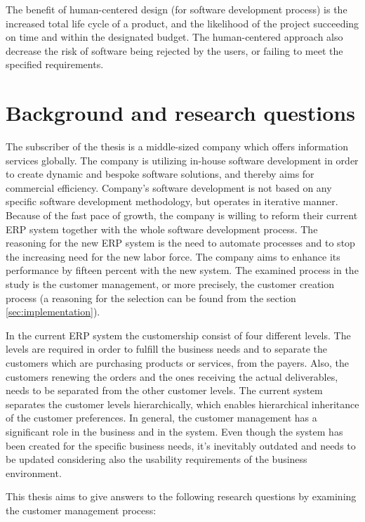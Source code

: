 \documentclass[12pt,a4paper,oneside,pdftex]{report}
\begin{document}
The benefit of human-centered design (for software development process) is the increased total life cycle of a product, and the likelihood of the project succeeding on time and within the designated budget. The human-centered approach also decrease the risk of software being rejected by the users, or failing to meet the specified requirements. \cite{RefWorks:16}

\section{Background and research questions}
\label{sec:background}
The subscriber of the thesis is a middle-sized company which offers information services globally. The company is utilizing in-house software development in order to create dynamic and bespoke software solutions, and thereby aims for commercial efficiency. Company's software development is not based on any specific software development methodology, but operates in iterative manner. Because of the fast pace of growth, the company is willing to reform their current ERP system together with the whole software development process. The reasoning for the new ERP system is the need to automate processes and to stop the increasing need for the new labor force. The company aims to enhance its performance by fifteen percent with the new system. The examined process in the study is the customer management, or more precisely, the customer creation process  (a reasoning for the selection can be found from the section \ref{sec:implementation}). 

In the current ERP system the customership consist of four different levels. The levels are required in order to fulfill the business needs and to separate the customers which are purchasing products or services, from the payers. Also, the customers renewing the orders and the ones receiving the actual deliverables, needs to be separated from the other customer levels. The current system separates the customer levels hierarchically, which enables hierarchical inheritance of the customer preferences. In general, the customer management has a significant role in the business and in the system. Even though the system has been created for the specific business needs, it's inevitably outdated and needs to be updated considering also the usability requirements of the business environment.

This thesis aims to give answers to the following research questions by examining the customer management process:
\end{document}
